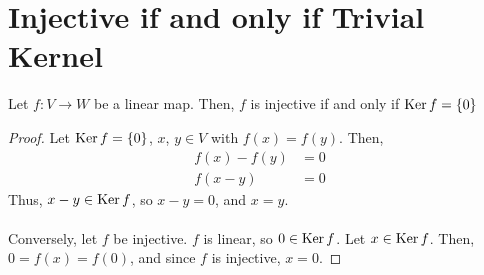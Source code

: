 \documentclass[letterpaper,12pt]{article}
\begin{document}
\section*{Injective if and only if Trivial Kernel}
\begin{theorem}
Let $f: V \rightarrow W$ be a linear map. Then, $f$ is injective if and only if $\operatorname{Ker}{f} = \left\{ 0 \right\}$
\end{theorem}
\begin{proof}
Let $\operatorname{Ker}{f} = \left\{ 0 \right\}$, $x$, $y \in V$ with $f(x) = f(y)$. Then,
\begin{align*}
    f(x) - f(y) & = 0 \\
    f(x - y) & = 0
\end{align*}
Thus, $x - y \in \operatorname{Ker}{f}$, so $x - y = 0$, and $x = y$.
\\ \\ Conversely, let $f$ be injective. $f$ is linear, so $0 \in \operatorname{Ker}{f}$. Let $x \in \operatorname{Ker}{f}$. Then, $0 = f(x) = f(0)$, and since $f$ is injective, $x = 0$.
\end{proof}
\end{document}
